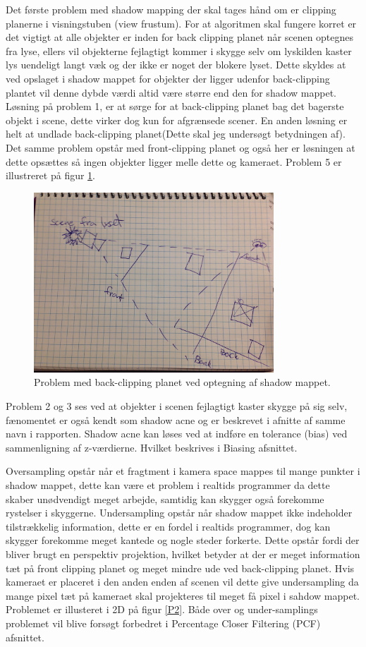 \documentclass[11pt,a4paper]{article}
\begin{document}
Det første problem med shadow mapping der skal tages hånd om er clipping planerne i visningstuben (view frustum). For at algoritmen skal fungere korret er det vigtigt at alle objekter er inden for back clipping planet når scenen optegnes fra lyse, ellers vil objekterne fejlagtigt kommer i skygge selv om lyskilden kaster lys uendeligt langt væk og der ikke er noget der blokere lyset. Dette skyldes at ved opslaget i shadow mappet for objekter der ligger udenfor back-clipping plantet vil denne dybde værdi altid være større end den for shadow mappet. Løsning på problem 1, er at sørge for at back-clipping planet bag det bagerste objekt i scene, dette virker dog kun for afgrænsede scener. En anden løsning er helt at undlade back-clipping planet(Dette skal jeg undersøgt betydningen af). Det samme problem opstår med front-clipping planet og også her er løsningen at dette opsættes så ingen objekter ligger melle dette og kameraet. Problem 5 er illustreret på figur \ref{P1}. 

\begin{figure}[ht!]
\centering
\includegraphics[width=90mm]{img/P1.jpg}
\caption{Problem med back-clipping planet ved optegning af shadow mappet.}
\label{P1}
\end{figure}

Problem 2 og 3 ses ved at objekter i scenen fejlagtigt kaster skygge på sig selv, fænomentet er også kendt som shadow acne og er beskrevet i afnitte af samme navn i rapporten. Shadow acne kan løses ved at indføre en tolerance (bias) ved sammenligning af z-værdierne. Hvilket beskrives i Biasing afsnittet.

Oversampling opstår når et fragtment i kamera space mappes til mange punkter i shadow mappet, dette kan være et problem i realtids programmer da dette skaber unødvendigt meget arbejde, samtidig kan skygger også forekomme rystelser i skyggerne. Undersampling opstår når shadow mappet ikke indeholder tilstrækkelig information, dette er en fordel i realtids programmer, dog kan skygger forekomme meget kantede og nogle steder forkerte.  Dette opstår fordi der bliver brugt en perspektiv projektion, hvilket betyder at der er meget information tæt på front clipping planet og meget mindre ude ved back-clipping planet. Hvis kameraet er placeret i den anden enden af scenen vil dette give undersampling da mange pixel tæt på kameraet skal projekteres til meget få pixel i sahdow mappet. Problemet er illusteret i 2D på figur \ref{P2}.  Både over og under-samplings problemet vil blive forsøgt forbedret i Percentage Closer Filtering (PCF) afsnittet.
\end{document}
